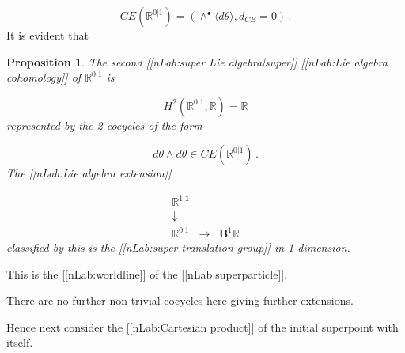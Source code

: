\documentclass[12pt,titlepage]{article}
\newcommand{\itexarray}[1]{\begin{matrix}#1\end{matrix}}
\theoremstyle{plain}
\newtheorem{prop}{Proposition}
\theoremstyle{definition}
\theoremstyle{remark}
\begin{document}
\begin{displaymath}
CE(\mathbb{R}^{0\vert 1})
  =
  \left(
    \wedge^\bullet \langle d\theta \rangle, d_{CE} = 0
  \right)
  \,.
\end{displaymath}
It is evident that

\begin{prop}
\label{1dsuperMinkowskiFromInvariantExtension}\hypertarget{1dsuperMinkowskiFromInvariantExtension}{}
The second [[nLab:super Lie algebra|super]] [[nLab:Lie algebra cohomology]] of $\mathbb{R}^{0\vert 1}$ is

\begin{displaymath}
H^{2}(\mathbb{R}^{0\vert 1}, \mathbb{R})
  =
  \mathbb{R}
\end{displaymath}
represented by the 2-cocycles of the form

\begin{displaymath}
d\theta\wedge d\theta
  \in CE(\mathbb{R}^{0\vert 1})
  \,.
\end{displaymath}
The [[nLab:Lie algebra extension]]

\begin{displaymath}
\itexarray{
    \mathbb{R}^{1|\mathbf{1}}
    \\
    \downarrow
    \\
    \mathbb{R}^{0|1}
    &\stackrel{}{\longrightarrow}&
    \mathbf{B}^1 \mathbb{R}
  }
\end{displaymath}
classified by this is the [[nLab:super translation group]] in 1-dimension.

\end{prop}
This is the [[nLab:worldline]] of the [[nLab:superparticle]].

There are no further non-trivial cocycles here giving further extensions.

Hence next consider the [[nLab:Cartesian product]] of the initial superpoint with itself.
\end{document}
